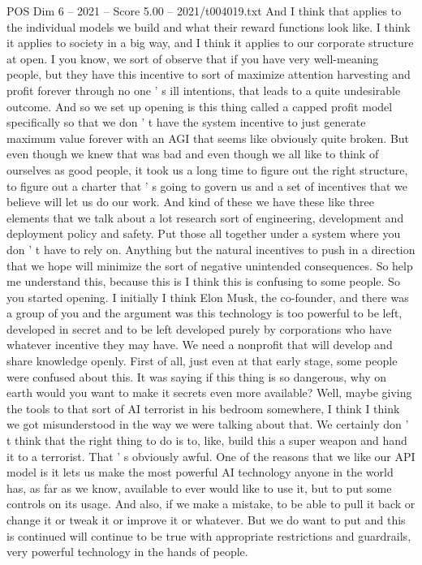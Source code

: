 \begin{textsample}{POS Dim 6 – 2021 – Score 5.00 – 2021/t004019.txt}
And I think that applies to the individual models we build and what their reward functions look like.
I think it applies to society in a big way, and I think it applies to our corporate structure at open.
I you know, we sort of observe that if you have very well-meaning people, but they have this incentive to sort of maximize attention harvesting and profit forever through no one ' s ill intentions, that leads to a quite undesirable outcome.
And so we set up opening is this thing called a capped profit model specifically so that we don ' t have the system incentive to just generate maximum value forever with an AGI that seems like obviously quite broken.
But even though we knew that was bad and even though we all like to think of ourselves as good people, it took us a long time to figure out the right structure, to figure out a charter that ' s going to govern us and a set of incentives that we believe will let us do our work.
And kind of these we have these like three elements that we talk about a lot research sort of engineering, development and deployment policy and safety.
Put those all together under a system where you don ' t have to rely on.
Anything but the natural incentives to push in a direction that we hope will minimize the sort of negative unintended consequences.
So help me understand this, because this is I think this is confusing to some people.
So you started opening.
I initially I think Elon Musk, the co-founder, and there was a group of you and the argument was this technology is too powerful to be left, developed in secret and to be left developed purely by corporations who have whatever incentive they may have.
We need a nonprofit that will develop and share knowledge openly.
First of all, just even at that early stage, some people were confused about this.
It was saying if this thing is so dangerous, why on earth would you want to make it secrets even more available?
Well, maybe giving the tools to that sort of AI terrorist in his bedroom somewhere, I think I think we got misunderstood in the way we were talking about that.
We certainly don ' t think that the right thing to do is to, like, build this a super weapon and hand it to a terrorist.
That ' s obviously awful.
One of the reasons that we like our API model is it lets us make the most powerful AI technology anyone in the world has, as far as we know, available to ever would like to use it, but to put some controls on its usage.
And also, if we make a mistake, to be able to pull it back or change it or tweak it or improve it or whatever.
But we do want to put and this is continued will continue to be true with appropriate restrictions and guardrails, very powerful technology in the hands of people.

\end{textsample}
